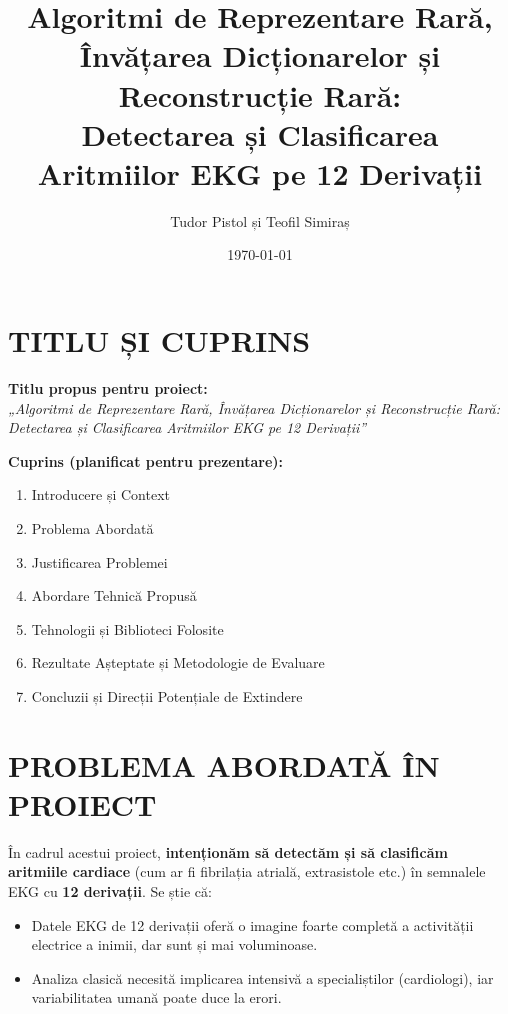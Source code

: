 \documentclass[12pt]{article}  %
\begin{document}
\title{\textbf{Algoritmi de Reprezentare Rară, Învățarea Dicționarelor și Reconstrucție Rară: 
\\
Detectarea și Clasificarea Aritmiilor EKG pe 12 Derivații}}
\author{Tudor Pistol și Teofil Simiraș}
\date{\today}
\maketitle

\tableofcontents

\section{TITLU ȘI CUPRINS}

\textbf{Titlu propus pentru proiect:}\\
\emph{„Algoritmi de Reprezentare Rară, Învățarea Dicționarelor și Reconstrucție Rară: Detectarea și Clasificarea Aritmiilor EKG pe 12 Derivații”}

\textbf{Cuprins (planificat pentru prezentare):}
\begin{enumerate}
    \item Introducere și Context
    \item Problema Abordată
    \item Justificarea Problemei
    \item Abordare Tehnică Propusă
    \item Tehnologii și Biblioteci Folosite
    \item Rezultate Așteptate și Metodologie de Evaluare
    \item Concluzii și Direcții Potențiale de Extindere
\end{enumerate}

\section{PROBLEMA ABORDATĂ ÎN PROIECT}

În cadrul acestui proiect, \textbf{intenționăm să detectăm și să clasificăm aritmiile cardiace} (cum ar fi fibrilația atrială, extrasistole etc.) în semnalele EKG cu \textbf{12 derivații}. Se știe că:

\begin{itemize}
    \item Datele EKG de 12 derivații oferă o imagine foarte completă a activității electrice a inimii, dar sunt și mai voluminoase.
    \item Analiza clasică necesită implicarea intensivă a specialiștilor (cardiologi), iar variabilitatea umană poate duce la erori.
\end{itemize}
\end{document}
